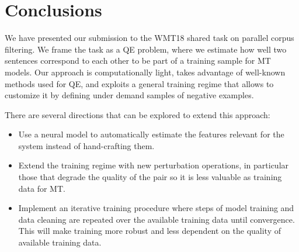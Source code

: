 \section{Conclusions}
We have presented our submission to the WMT18 shared task on parallel corpus filtering. We frame the task as a QE problem, where we estimate how well two sentences correspond to each other to be part of a training sample for MT models. Our approach is computationally light, takes advantage of well-known methods used for QE, and exploits a general training regime that allows to customize it by defining under demand samples of negative examples.

There are several directions that can be explored to extend this approach:
\begin{itemize}
\item Use a neural model to automatically estimate the features relevant for the system instead of hand-crafting them.
\item Extend the training regime with new perturbation operations, in particular those that degrade the quality of the pair so it is less valuable as training data for MT.
\item Implement an iterative training procedure where steps of model training and data cleaning are repeated over the available training data until convergence. This will make training more robust and less dependent on the quality of available training data.
\end{itemize}